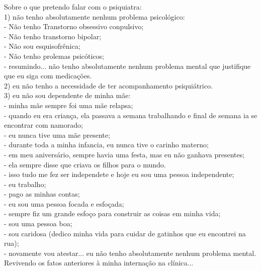 \documentclass{book}
\begin{document}
Sobre o que pretendo falar com o psiquiatra: \\

1) não tenho absolutamente nenhum problema psicológico: \\

- Não tenho Transtorno obsessivo conpulsivo; \\
- Não tenho transtorno bipolar; \\
- Não sou esquisofrênica; \\
- Não tenho prolemas psicóticos; \\
- resumindo... não tenho absolutamente nenhum problema mental que justifique que eu siga com medicações. \\

2) eu não tenho a necessidade de ter acompanhamento psiquiátrico. \\

3) eu não sou dependente de minha mãe: \\

- minha mãe sempre foi uma mãe relapsa; \\
- quando eu era criança, ela passava a semana trabalhando e final de semana ia se encontrar com namorado; \\
- eu nunca tive uma mãe presente; \\
- durante toda a minha infancia, eu nunca tive o carinho materno; \\
- em meu aniversário, sempre havia uma festa, mas eu não ganhava presentes; \\
- ela sempre disse que criava os filhos para o mundo. \\

- isso tudo me fez ser independete e hoje eu sou uma pessoa independente; \\

- eu trabalho; \\
- pago as minhas contas; \\
- eu sou uma pessoa focada e esfoçada; \\
- sempre fiz um grande esfoço para construir as coisas em minha vida; \\
- sou uma pessoa boa; \\
- sou caridosa (dedico minha vida para cuidar de gatinhos que eu encontrei na rua); \\
- novamente vou atestar... eu não tenho absolutamente nenhum problema mental. \\


Revivendo os fatos anteriores à minha internação na clínica... \\
\end{document}
